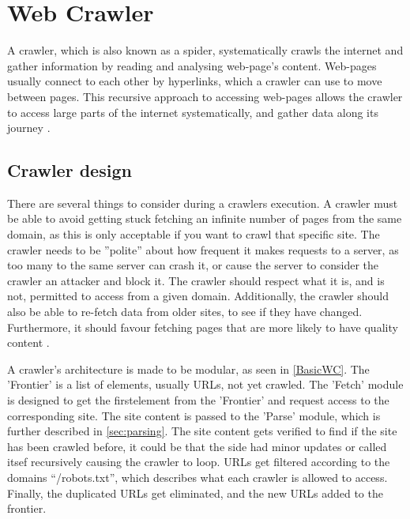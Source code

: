 \section{Web Crawler}\label{subsec:crawler}
A crawler, which is also known as a spider, systematically crawls the internet
and gather information by reading and analysing web-page's content. Web-pages
usually connect to each other by hyperlinks, which a crawler can use to move
between pages. This recursive approach to accessing web-pages allows the crawler
to access large parts of the internet systematically, and gather data along its
journey \citep[Ch20.2, P.444-445]{manning2008introduction}.

\subsection{Crawler design} 
There are several things to consider during a crawlers execution. A crawler must
be able to avoid getting stuck fetching an infinite number of pages from the
same domain, as this is only acceptable if you want to crawl that specific site.
The crawler needs to be ''polite'' about how frequent it makes requests to a
server, as too many to the same server can crash it, or cause the server to
consider the crawler an attacker and block it. The crawler should respect what
it is, and is not, permitted to access from a given domain. Additionally, the
crawler should also be able to re-fetch data from older sites, to see if they
have changed. Furthermore, it should favour fetching pages that are more
likely to have quality content \citep[Ch.20.1]{manning2008introduction}.\nl

A crawler's architecture is made to be modular, as seen in \autoref{BasicWC}.
The 'Frontier' is a list of elements, usually URLs, not yet crawled. The 'Fetch'
module is designed to get the firstelement from the 'Frontier' and request
access to the corresponding site. The site content is passed to the 'Parse'
module, which is further described in \autoref{sec:parsing}. The site content
gets verified to find if the site has been crawled before, it could be that the
side had minor updates or called itsef recursively causing the crawler to loop.
URLs get filtered according to the domains ``/robots.txt'', which describes what
each crawler is allowed to access. Finally, the duplicated URLs get eliminated,
and the new URLs added to the frontier.\nl


